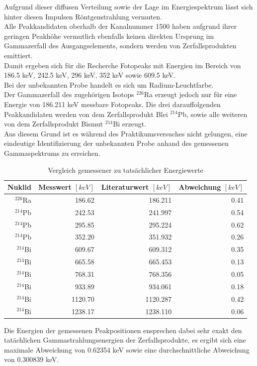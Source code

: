 \documentclass[12pt,german]{article}
\begin{document}
    Aufgrund dieser diffusen Verteilung sowie der Lage im Energiespektrum lässt sich hinter diesen Impulsen Röntgenstrahlung vermuten. \\
    Alle Peakkandidaten oberhalb der Kanalnummer 1500 haben aufgrund ihrer geringen Peakhöhe vermutlich ebenfalls keinen direkten Ursprung im Gammazerfall des Ausgangselements, sondern werden von Zerfallsprodukten emittiert. \\
    Damit ergeben sich für die Recherche Fotopeaks mit Energien im Bereich von 186.5 keV, 242.5 keV, 296 keV, 352 keV sowie 609.5 keV. \\
    Bei der unbekannten Probe handelt es sich um Radium-Leuchtfarbe. \\
    Der Gammazerfall des zugehörigen Isotops \(^{226}\)Ra erzeugt jedoch nur für eine Energie von 186.211 keV messbare Fotopeaks. Die drei darauffolgenden Peakkandidaten werden von dem Zerfallsprodukt Blei \(^{214}\)Pb, sowie alle weiteren von dem Zerfallsprodukt Bismut \(^{214}\)Bi erzeugt. \\
    Aus diesem Grund ist es während des Praktikumsversuches nicht gelungen, eine eindeutige Identifizierung der unbekannten Probe anhand des gemessenen Gammaspektrums zu erreichen. 
    \begin{table}[H]
        \centering
        \begin{tabularx}{1.0\textwidth}{R|R|R|R}
            \toprule
            Nuklid &  Messwert \([keV]\) & Literaturwert \([keV]\) & Abweichung \([keV]\) \\
            \midrule
            \(^{226}\)Ra & 186.62 & 186.211 &   0.41 \\
            \(^{214}\)Pb & 242.53 & 241.997 &   0.54 \\
            \(^{214}\)Pb & 295.85 & 295.224 &   0.62 \\
            \(^{214}\)Pb & 352.20 & 351.932 &   0.26 \\
            \(^{214}\)Bi & 609.67 & 609.312 &   0.35 \\
            \(^{214}\)Bi & 665.58 & 665.453 &   0.13 \\
            \(^{214}\)Bi & 768.31 & 768.356 &   0.05 \\
            \(^{214}\)Bi & 933.89 & 934.061 &   0.18 \\
            \(^{214}\)Bi & 1120.70 & 1120.287 &   0.42 \\
            \(^{214}\)Bi & 1238.17 & 1238.110 &   0.06 \\
            \bottomrule
        \end{tabularx}
        \caption{Vergleich gemessener zu tatsächlicher Energiewerte}
    \end{table}
    Die Energien der gemessenen Peakpositionen ensprechen dabei sehr exakt den tatächlichen Gammastrahlungsenergien der Zerfallsprodukte, es ergibt sich eine maximale Abweichung von 0.62354 keV sowie eine durchschnittliche Abweichung von 0.300839 keV.
\end{document}

